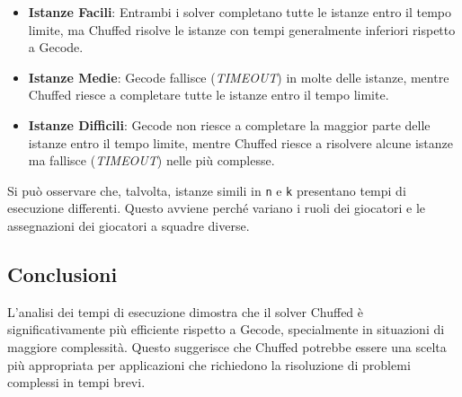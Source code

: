 \documentclass{article}
\begin{document}
\begin{multicols*}{2}
\begin{itemize}
    \item \textbf{Istanze Facili}: Entrambi i solver completano tutte le istanze entro il tempo limite, ma Chuffed risolve le istanze con tempi generalmente inferiori rispetto a Gecode.
    \item \textbf{Istanze Medie}: Gecode fallisce (\textit{TIMEOUT}) in molte delle istanze, mentre Chuffed riesce a completare tutte le istanze entro il tempo limite.
    \item \textbf{Istanze Difficili}: Gecode non riesce a completare la maggior parte delle istanze entro il tempo limite, mentre Chuffed riesce a risolvere alcune istanze ma fallisce (\textit{TIMEOUT}) nelle più complesse.
\end{itemize}
Si può osservare che, talvolta, istanze simili in \texttt{n} e \texttt{k} presentano tempi di esecuzione differenti. Questo avviene perché variano i ruoli dei giocatori e le assegnazioni dei giocatori a squadre diverse.

\subsection{Conclusioni}
L'analisi dei tempi di esecuzione dimostra che il solver Chuffed è significativamente più efficiente rispetto a Gecode, specialmente in situazioni di maggiore complessità. Questo suggerisce che Chuffed potrebbe essere una scelta più appropriata per applicazioni che richiedono la risoluzione di problemi complessi in tempi brevi.


\end{multicols*}
\end{document}
